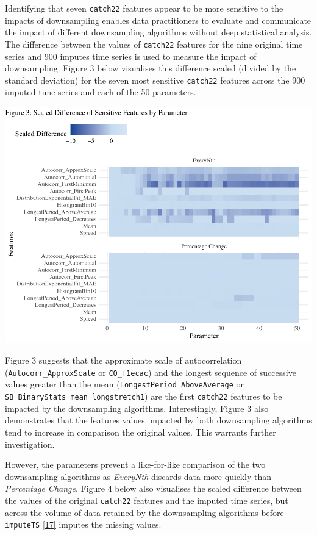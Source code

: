 \documentclass{article}
\begin{document}
Identifying that seven \texttt{catch22} features appear to be more
sensitive to the impacts of downsampling enables data practitioners to
evaluate and communicate the impact of different downsampling algorithms
without deep statistical analysis. The difference between the values of
\texttt{catch22} features for the nine original time series and 900
imputes time series is used to measure the impact of downsampling.
Figure 3 below visualises this difference scaled (divided by the
standard deviation) for the seven most sensitive \texttt{catch22}
features across the 900 imputed time series and each of the 50
parameters.

\includegraphics{210431461_CSC8639_Dissertation_files/figure-latex/Heatmap_param-1.pdf}

Figure 3 suggests that the approximate scale of autocorrelation
(\texttt{Autocorr\_ApproxScale} or \texttt{CO\_f1ecac}) and the longest
sequence of successive values greater than the mean
(\texttt{LongestPeriod\_AboveAverage} or
\texttt{SB\_BinaryStats\_mean\_longstretch1}) are the first
\texttt{catch22} features to be impacted by the downsampling algorithms.
Interestingly, Figure 3 also demonstrates that the features values
impacted by both downsampling algorithms tend to increase in comparison
the original values. This warrants further investigation.

However, the parameters prevent a like-for-like comparison of the two
downsampling algorithms as \emph{EveryNth} discards data more quickly
than \emph{Percentage Change}. Figure 4 below also visualises the scaled
difference between the values of the original \texttt{catch22} features
and the imputed time series, but across the volume of data retained by
the downsampling algorithms before \texttt{imputeTS}
\protect\hyperlink{ref-imputeTS_R}{{[}17{]}} imputes the missing values.
\end{document}
